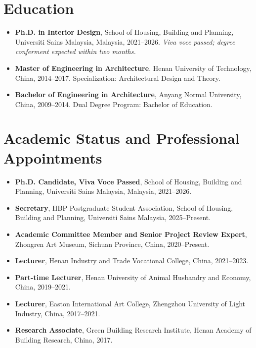 \documentclass[11pt,a4paper]{article}
\begin{document}
\section*{Education}
\begin{itemize}
  \item \textbf{Ph.D. in Interior Design}, School of Housing, Building and Planning, Universiti Sains Malaysia, Malaysia, 2021--2026. \textit{Viva voce passed; degree conferment expected within two months.}
  \item \textbf{Master of Engineering in Architecture}, Henan University of Technology, China, 2014--2017. Specialization: Architectural Design and Theory.
  \item \textbf{Bachelor of Engineering in Architecture}, Anyang Normal University, China, 2009--2014. Dual Degree Program: Bachelor of Education.
\end{itemize}

\section*{Academic Status and Professional Appointments}
\begin{itemize}
  \item \textbf{Ph.D. Candidate, Viva Voce Passed}, School of Housing, Building and Planning, Universiti Sains Malaysia, Malaysia, 2021--2026.
  \item \textbf{Secretary}, HBP Postgraduate Student Association, School of Housing, Building and Planning, Universiti Sains Malaysia, 2025--Present.
  \item \textbf{Academic Committee Member and Senior Project Review Expert}, Zhongren Art Museum, Sichuan Province, China, 2020--Present.
  \item \textbf{Lecturer}, Henan Industry and Trade Vocational College, China, 2021--2023.
  \item \textbf{Part-time Lecturer}, Henan University of Animal Husbandry and Economy, China, 2019--2021.
  \item \textbf{Lecturer}, Easton International Art College, Zhengzhou University of Light Industry, China, 2017--2021.
  \item \textbf{Research Associate}, Green Building Research Institute, Henan Academy of Building Research, China, 2017.
\end{itemize}
\end{document}
